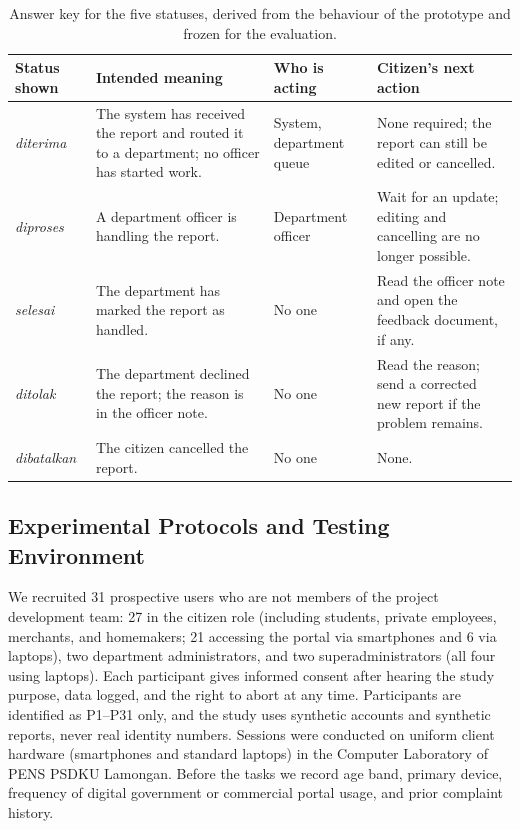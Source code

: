 \documentclass[11pt, runningheads, a4paper]{llncs}
\renewcommand{\st}[1]{\textit{#1}}
\newcommand{\rev}[1]{#1}
\begin{document}
\begin{table}[!htbp]
\caption{Answer key for the five statuses, derived from the behaviour of the
prototype and frozen for the evaluation.}
\label{tab:key}
\centering
\scriptsize
\setlength{\tabcolsep}{4pt}
\renewcommand{\arraystretch}{1.18}
\begin{tabularx}{\textwidth}{@{}L{1.8cm} Y L{2.6cm} Y@{}}
\toprule
Status shown & Intended meaning & Who is acting & Citizen's next action \\
\midrule
\st{diterima} & The system has received the report and routed it to a department; no officer has started work. & System, department queue & None required; the report can still be edited or cancelled. \\
\addlinespace[1pt]
\st{diproses} & A department officer is handling the report. & Department officer & Wait for an update; editing and cancelling are no longer possible. \\
\addlinespace[1pt]
\st{selesai} & The department has marked the report as handled. & No one & Read the officer note and open the feedback document, if any. \\
\addlinespace[1pt]
\st{ditolak} & The department declined the report; the reason is in the officer note. & No one & Read the reason; send a corrected new report if the problem remains. \\
\addlinespace[1pt]
\st{dibatalkan} & The citizen cancelled the report. & No one & None. \\
\bottomrule
\end{tabularx}
\end{table}

\subsection{Experimental Protocols and Testing Environment}
\rev{We recruited 31 prospective users who are not members of the project development team: 27 in the citizen role (including students, private employees, merchants, and homemakers; 21 accessing the portal via smartphones and 6 via laptops), two department administrators, and two superadministrators (all four using laptops). Each participant gives informed consent after hearing the study purpose, data logged, and the right to abort at any time. Participants are identified as P1--P31 only, and the study uses synthetic accounts and synthetic reports, never real identity numbers. Sessions were conducted on uniform client hardware (smartphones and standard laptops) in the Computer Laboratory of PENS PSDKU Lamongan. Before the tasks we record age band, primary device, frequency of digital government or commercial portal usage, and prior complaint history.}
\end{document}
